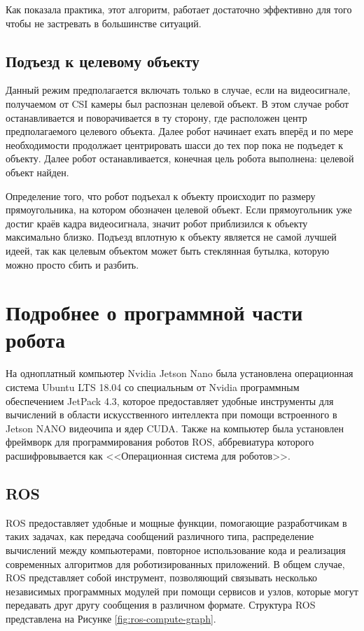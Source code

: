 Как показала практика, этот алгоритм, работает достаточно эффективно для того чтобы не застревать в большинстве ситуаций.

\subsection{Подъезд к целевому объекту}

Данный режим предполагается включать только в случае, если на видеосигнале, получаемом от CSI камеры был распознан целевой объект. В этом случае робот останавливается и поворачивается в ту сторону, где расположен центр предполагаемого целевого объекта. Далее робот начинает ехать вперёд и по мере необходимости продолжает центрировать шасси до тех пор пока не подъедет к объекту. Далее робот останавливается, конечная цель робота выполнена: целевой объект найден. 

Определение того, что робот подъехал к объекту происходит по размеру прямоугольника, на котором обозначен целевой объект. Если прямоугольник уже достиг краёв кадра видеосигнала, значит робот приблизился к объекту максимально близко. Подъезд вплотную к объекту является не самой лучшей идеей, так как целевым объектом может быть стеклянная бутылка, которую можно просто сбить и разбить.

\section{Подробнее о программной части робота}
На одноплатный компьютер Nvidia Jetson Nano была установлена операционная система Ubuntu LTS 18.04 со специальным от Nvidia программным обеспечением JetPack 4.3, которое предоставляет удобные инструменты для вычислений в области искусственного интеллекта при помощи встроенного в Jetson NANO видеочипа и ядер CUDA. Также на компьютер была установлен фреймворк для программирования роботов ROS, аббревиатура которого расшифровывается как <<Операционная система для роботов>>.

\subsection{ROS}
ROS предоставляет удобные и мощные функции, помогающие разработчикам в таких задачах, как передача сообщений различного типа, распределение вычислений между компьютерами, повторное использование кода и реализация современных алгоритмов для роботизированных приложений. В общем случае, ROS представляет собой инструмент, позволяющий связывать несколько независимых программных модулей при помощи сервисов и узлов, которые могут передавать друг другу сообщения в различном формате. Структура ROS представлена на Рисунке \ref{fig:ros-compute-graph}.

